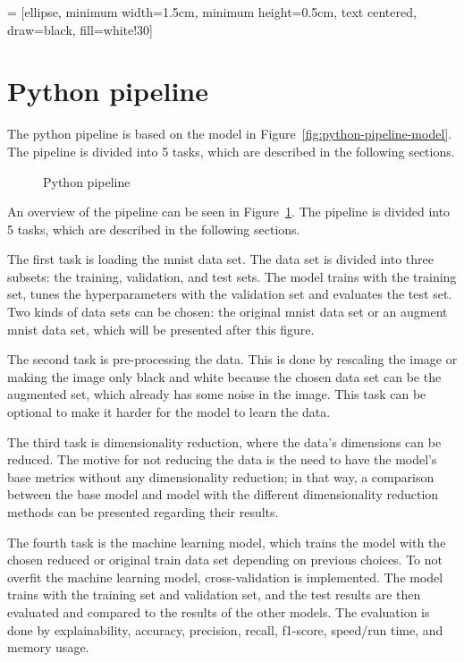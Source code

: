  = [ellipse, minimum width=1.5cm, minimum height=0.5cm, text centered, draw=black, fill=white!30]
\section{Python pipeline}\label{sec:python-pipeline}
The python pipeline is based on the model in Figure~\ref{fig:python-pipeline-model}. The pipeline is divided into 5 tasks, which are described in the following sections. 

\begin{figure}[htb!]
    \centering
    
    \caption{Python pipeline}
    \label{fig:Python-pipeline}
\end{figure}

An overview of the pipeline can be seen in Figure~\ref{fig:Python-pipeline}. The pipeline is divided into 5 tasks, which are described in the following sections. 

 
The first task is loading the \gls{mnist} data set. The data set is divided into three subsets: the training, validation, and test sets. 
The model trains with the training set, tunes the hyperparameters with the validation set and evaluates the test set. Two kinds of data sets can be chosen: the original \gls{mnist} data set or an augment \gls{mnist} data set, which will be presented after this figure. 

The second task is pre-processing the data. This is done by rescaling the image or making the image only black and white because the chosen data set can be the augmented set, which already has some noise in the image. This task can be optional to make it harder for the model to learn the data.

The third task is dimensionality reduction, where the data's dimensions can be reduced. The motive for not reducing the data is the need to have the model's base metrics without any dimensionality reduction; in that way, a comparison between the base model and model with the different dimensionality reduction methods can be presented regarding their results.

The fourth task is the machine learning model, which trains the model with the chosen reduced or original train data set depending on previous choices. 
To not overfit the machine learning model, cross-validation is implemented.
The model trains with the training set and validation set, and the test results are then evaluated and compared to the results of the other models. The evaluation is done by explainability, accuracy, precision, recall, f1-score, speed/run time, and memory usage.

